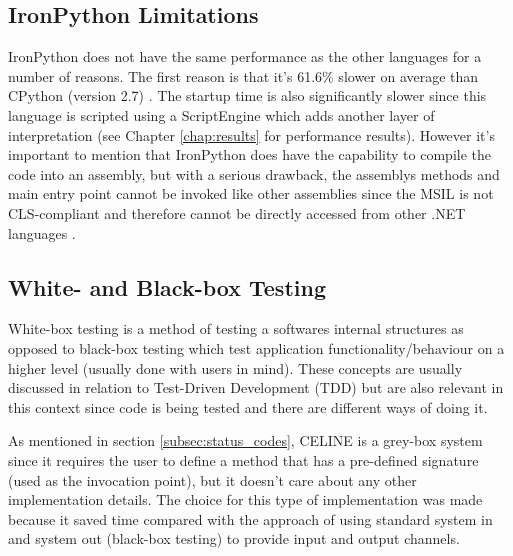 \subsection{IronPython Limitations} \label{subsec:ironpython_limitations}
IronPython does not have the same performance as the other languages for a number of reasons. The first reason is that it's 61.6\% slower on average than CPython (version 2.7) \cite{IronPythonPerformance}. The startup time is also significantly slower since this language is scripted using a ScriptEngine which adds another layer of interpretation (see Chapter \ref{chap:results} for performance results). However it's important to mention that IronPython does have the capability to compile the code into an assembly, but with a serious drawback, the assemblys methods and main entry point cannot be invoked like other assemblies since the MSIL is not CLS-compliant \cite{CLSCompliant} and therefore cannot be directly accessed from other .NET languages \cite{AccessingPythonCode}. 


\subsection{White- and Black-box Testing} \label{subsec:whitebox_blackbox}
White-box testing is a method of testing a softwares internal structures as opposed to black-box testing which test application functionality/behaviour on a higher level (usually done with users in mind). These concepts are usually discussed in relation to Test-Driven Development (TDD) but are also relevant in this context since code is being tested and there are different ways of doing it.  

As mentioned in section \ref{subsec:status_codes}, CELINE is a grey-box system since it requires the user to define a method that has a pre-defined signature (used as the invocation point), but it doesn't care about any other implementation details. The choice for this type of implementation was made because it saved time compared with the approach of using standard system in and system out (black-box testing) to provide input and output channels. 

